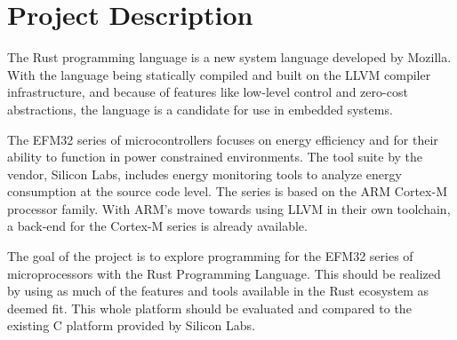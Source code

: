 
\chapter{Project Description}
\label{chap:problem}

The Rust programming language is a new system language developed by Mozilla.
With the language being statically compiled and built on the LLVM compiler infrastructure, and because of features like low-level control and zero-cost abstractions, the language is a candidate for use in embedded systems.

The EFM32 series of microcontrollers focuses on energy efficiency and for their ability to function in power constrained environments.
The tool suite by the vendor, Silicon Labs, includes energy monitoring tools to analyze energy consumption at the source code level.
The series is based on the ARM Cortex-M processor family.
With ARM's move towards using LLVM in their own toolchain, a back-end for the Cortex-M series is already available.

The goal of the project is to explore programming for the EFM32 series of microprocessors with the Rust Programming Language.
This should be realized by using as much of the features and tools available in the Rust ecosystem as deemed fit.
This whole platform should be evaluated and compared to the existing C platform provided by Silicon Labs.
